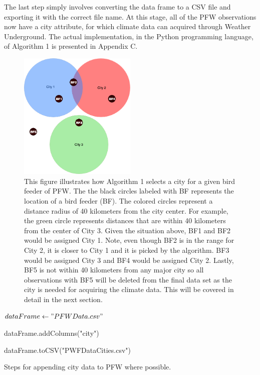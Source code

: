 The last step simply involves converting the data frame to a CSV file and exporting it with the correct file name. At this stage, all of the PFW observations now have a city attribute, for which climate data can acquired through Weather Underground. The actual implementation, in the Python programming language, of Algorithm 1 is presented in Appendix C.   

\begin{figure}[h]
\centering
\includegraphics[width=0.5\textwidth]{figures/BFandCities.png}
\caption{This figure illustrates how Algorithm 1 selects a city for a given bird feeder of PFW. The the black circles labeled with BF represents the location of a bird feeder (BF). The colored circles represent a distance radius of 40 kilometers from the city center. For example, the green circle represents distances that are within 40 kilometers from the center of City 3. Given the situation above, BF1 and BF2 would be assigned City 1. Note, even though BF2 is in the range for City 2, it is closer to City 1 and it is picked by the algorithm. BF3 would be assigned City 3 and BF4 would be assigned City 2. Lastly, BF5 is not within 40 kilometers from any major city so all observations with BF5 will be deleted from the final data set as the city is needed for acquiring the climate data. This will be covered in detail in the next section.}
\end{figure}

\begin{algorithm}[H]
\DontPrintSemicolon
{}
 
$dataFrame\leftarrow "PFWData.csv"$    \;

dataFrame.addColumns("city")
 

\Return dataFrame.toCSV("PWFDataCities.csv")
 
\caption{Steps for appending city data to PFW where possible.}
\end{algorithm}

